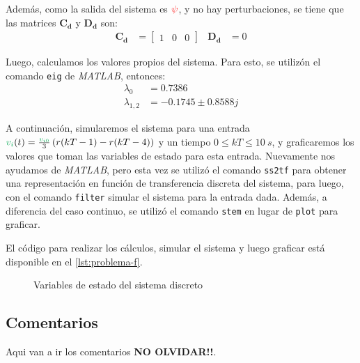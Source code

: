 Además, como la salida del sistema es $\mathbin{\color{red}\psi}$, y no hay perturbaciones,
se tiene que las matrices $\pmb{C_{d}}$ y $\pmb{D_{d}}$ son:
\begin{align}
  \pmb{C_{d}} &= \begin{bmatrix}
      1 & 0 & 0
  \end{bmatrix} &
  \pmb{D_{d}} &= 0
\end{align}

Luego, calculamos los valores propios del sistema. Para esto, se utilizón el
comando \verb|eig| de \textit{MATLAB}, entonces:
\begin{align}
  \lambda_{0} &=  0.7386 \\
  \lambda_{1,2} &=  -0.1745 \pm 0.8588j
\end{align}

A continuación, simularemos el sistema para una entrada
$\verd{v_{i}}(t) = \frac{\verd{v_{i0}}}{3}\left(r(kT-1) - r(kT-4)\right)$
y un tiempo $0 \leq kT \leq 10\ \unit{s}$, y graficaremos los valores que
toman las variables de estado para esta entrada. Nuevamente nos ayudamos
de \textit{MATLAB}, pero esta vez se utilizó el comando \verb|ss2tf| para
obtener una representación en función de transferencia discreta del sistema,
para luego, con el comando \verb|filter| simular el sistema para la entrada
dada. Además, a diferencia del caso continuo, se utilizó el comando \verb|stem|
en lugar de \verb|plot| para graficar.

El código para realizar los cálculos, simular el sistema y luego graficar está
disponible en el \autoref{lst:problema-f}.

\begin{figure}[h]
  \centering
  
  \caption{Variables de estado del sistema discreto}\label{fig:estado-discreto}
\end{figure}

\subsection{Comentarios}

Aqui van a ir los comentarios \textbf{NO OLVIDAR!!}.
